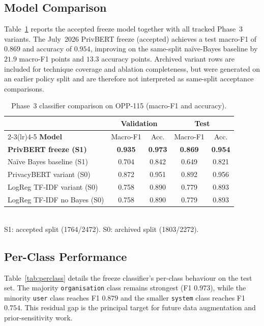 \documentclass[conference]{IEEEtran}
\begin{document}
\subsection{Model Comparison}
Table~\ref{tab:modelcomp} reports the accepted freeze model together with all
tracked Phase~3 variants. The July~2026 PrivBERT freeze (accepted) achieves a
test macro-F1 of $0.869$ and accuracy of $0.954$, improving on the same-split
na\"ive-Bayes baseline by $21.9$ macro-F1 points and $13.3$ accuracy points.
Archived variant rows are included for technique coverage and ablation
completeness, but were generated on an earlier policy split and are therefore
not interpreted as same-split acceptance comparisons.

\begin{table}[t]
\centering
\caption{Phase~3 classifier comparison on OPP-115 (macro-F1 and accuracy).}
\label{tab:modelcomp}
\scriptsize
\setlength{\tabcolsep}{3pt}
\begin{tabular}{@{}l cccc@{}}
\toprule
& \multicolumn{2}{c}{\textbf{Validation}} & \multicolumn{2}{c}{\textbf{Test}} \\
\cmidrule(lr){2-3}\cmidrule(lr){4-5}
\textbf{Model} & Macro-F1 & Acc. & Macro-F1 & Acc. \\
\midrule
\textbf{PrivBERT freeze (S1)} & \textbf{0.935} & \textbf{0.973} & \textbf{0.869} & \textbf{0.954} \\
Na\"ive Bayes baseline (S1) & 0.704 & 0.842 & 0.649 & 0.821 \\
PrivacyBERT variant (S0) & 0.872 & 0.951 & 0.892 & 0.956 \\
LogReg TF-IDF variant (S0) & 0.758 & 0.890 & 0.779 & 0.893 \\
LogReg TF-IDF no Bayes (S0) & 0.758 & 0.890 & 0.779 & 0.893 \\
\bottomrule
\end{tabular}
\\[-0.5ex]
{\scriptsize S1: accepted split (1764/2472). S0: archived split (1803/2272).}
\end{table}

\subsection{Per-Class Performance}
Table~\ref{tab:perclass} details the freeze classifier's per-class behaviour
on the test set. The majority \texttt{organisation} class remains strongest
(F1 $0.973$), while the minority \texttt{user} class reaches F1 $0.879$ and
the smaller \texttt{system} class reaches F1 $0.754$. This residual gap is
the principal target for future data augmentation and prior-sensitivity work.
\end{document}
